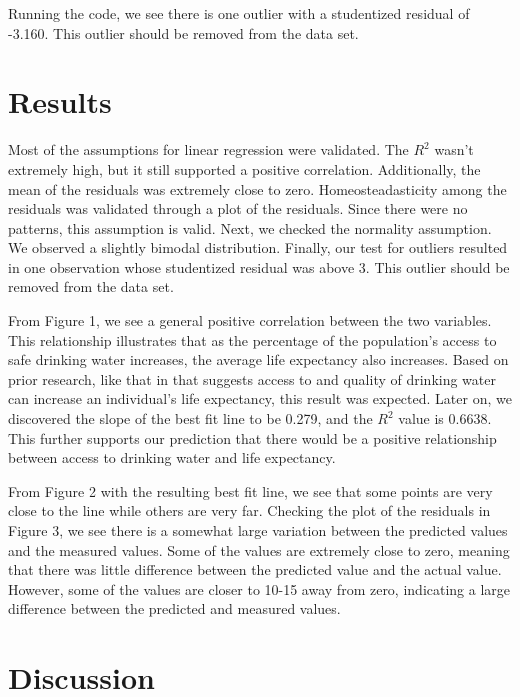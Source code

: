 \documentclass[12pt]{article}
\begin{document}
Running the code, we see there is one outlier with a studentized residual of -3.160. This outlier should be removed from the data set.

\section{Results}

Most of the assumptions for linear regression were validated. The $R^2$ wasn't extremely high, but it still supported a positive correlation. Additionally, the mean of the residuals was extremely close to zero. Homeosteadasticity among the residuals was validated through a plot of the residuals. Since there were no patterns, this assumption is valid. Next, we checked the normality assumption. We observed a slightly bimodal distribution. Finally, our test for outliers resulted in one observation whose studentized residual was above 3. This outlier should be removed from the data set.

From Figure 1, we see a general positive correlation between the two variables. This relationship illustrates that as the percentage of the population's access to safe drinking water increases, the average life expectancy also increases. Based on prior research, like that in \citet{angelakis2021quality} that suggests access to and quality of drinking water can increase an individual's life expectancy, this result was expected. Later on, we discovered the slope of the best fit line to be 0.279, and the $R^2$ value is 0.6638. This further supports our prediction that there would be a positive relationship between access to drinking water and life expectancy.

From Figure 2 with the resulting best fit line, we see that some points are very close to the line while others are very far. Checking the plot of the residuals in Figure 3, we see there is a somewhat large variation between the predicted values and the measured values. Some of the values are extremely close to zero, meaning that there was little difference between the predicted value and the actual value. However, some of the values are closer to 10-15 away from zero, indicating a large difference between the predicted and measured values.

\section{Discussion}
\end{document}
